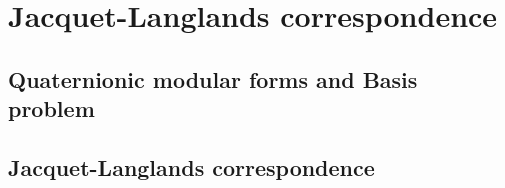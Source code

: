 \section{Jacquet-Langlands correspondence}

\subsection{Quaternionic modular forms and Basis problem}
\cite{martin2020basis}

\subsection{Jacquet-Langlands correspondence}